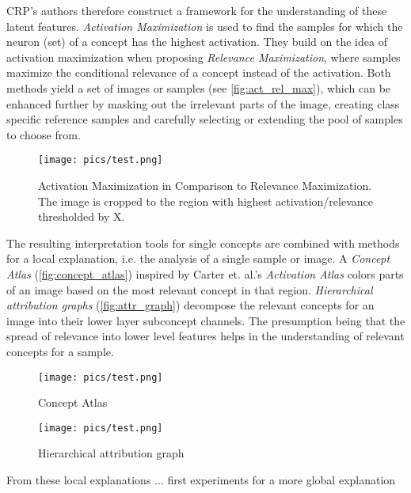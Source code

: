 CRP's authors therefore construct a framework for the understanding of these latent features. \textit{Activation Maximization} is used to find the samples for which the neuron (set) of a concept has the highest activation. They build on the idea of activation maximization when proposing \textit{Relevance Maximization}, where samples maximize the conditional relevance of a concept instead of the activation. Both methods yield a set of images or samples (see \autoref{fig:act_rel_max}), which can be enhanced further by masking out the irrelevant parts of the image, creating class specific reference samples and carefully selecting or extending the pool of samples to choose from. 

\begin{figure}[htbp]
    \centering
	\texttt{[image: pics/test.png]}
    \caption{Activation Maximization in Comparison to Relevance Maximization. The image is cropped to the region with highest activation/relevance thresholded by X. }
    \label{fig:act_rel_max}
\end{figure}

The resulting interpretation tools for single concepts are combined with methods for a local explanation, i.e. the analysis of a single sample or image. A \textit{Concept Atlas} (\autoref{fig:concept_atlas}) inspired by Carter et. al.'s \textit{Activation Atlas}  colors parts of an image based on the most relevant concept in that region. \textit{Hierarchical attribution graphs} (\autoref{fig:attr_graph}) decompose the relevant concepts for an image into their lower layer subconcept channels. The presumption being that the spread of relevance into lower level features helps in the understanding of relevant concepts for a sample.

\begin{figure}[htbp]
    \centering
	\texttt{[image: pics/test.png]}
    \caption{Concept Atlas}
    \label{fig:concept_atlas}
\end{figure}

\begin{figure}[htbp]
    \centering
	\texttt{[image: pics/test.png]}
    \caption{Hierarchical attribution graph}
    \label{fig:attr_graph}
\end{figure}

From these local explanations ... 
first experiments for a more global explanation


